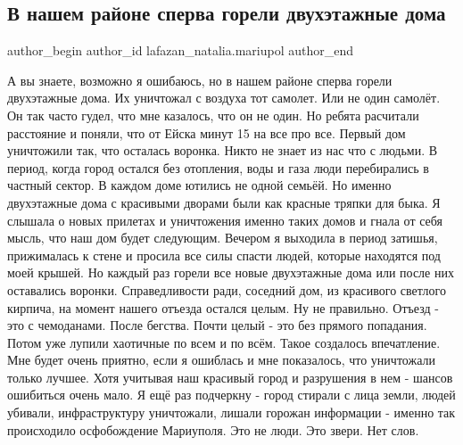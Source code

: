  
 
 
 
 

\subsection{В нашем районе сперва горели двухэтажные дома}
\label{sec:28_04_2022.fb.lafazan_natalia.mariupol.1.v_nashem_rajone_sperva_goreli_dvuhetazhnye_doma}

\ifcmt
 author_begin
   author_id lafazan_natalia.mariupol
 author_end
\fi

А вы знаете, возможно я ошибаюсь, но в нашем районе сперва горели двухэтажные
дома. Их уничтожал с воздуха тот самолет. Или не один самолёт. Он так часто
гудел, что мне казалось, что он не один. Но ребята расчитали расстояние и
поняли, что от Ейска минут 15 на все про все. Первый дом уничтожили так, что
осталась воронка. Никто не знает из нас что с людьми. В период, когда город
остался без отопления, воды и газа люди перебирались в частный сектор. В каждом
доме ютились не одной семьёй. Но именно двухэтажные дома с красивыми дворами
были как красные тряпки для быка. Я слышала о новых прилетах и уничтожения
именно таких домов и гнала от себя мысль, что наш дом будет следующим. Вечером
я выходила в период затишья, прижималась к стене и просила все силы спасти
людей, которые находятся под моей крышей. Но каждый раз горели все новые
двухэтажные дома или после них оставались воронки. Справедливости ради,
соседний дом, из красивого светлого кирпича, на момент нашего отъезда остался
целым. Ну не правильно. Отъезд - это с чемоданами. После бегства. Почти целый -
это без прямого попадания. Потом уже лупили хаотичные по всем и по всём. Такое
создалось впечатление. Мне будет очень приятно, если я ошиблась и мне
показалось, что уничтожали только лучшее. Хотя учитывая наш красивый город и
разрушения в нем - шансов ошибиться очень мало. Я ещё раз подчеркну - город
стирали с лица земли, людей убивали, инфраструктуру уничтожали, лишали горожан
информации - именно так происходило осфобождение Мариуполя. Это не люди. Это
звери. Нет слов.

